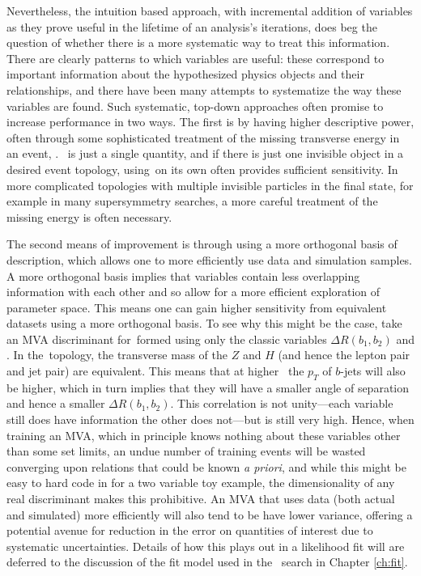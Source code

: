 Nevertheless, the intuition based approach, with incremental addition of variables as they prove useful in the lifetime of an analysis's iterations, does beg the question of whether there is a more systematic way to treat this information.  There are clearly patterns to which variables are useful: these correspond to important information about the hypothesized physics objects and their relationships, and there have been many attempts to systematize the way these variables are found.  Such systematic, top-down approaches often promise to increase performance in two ways.  The first is by having higher descriptive power, often through some sophisticated treatment of the missing transverse energy in an event, \met.  \met\, is just a single quantity, and if there is just one invisible object in a desired event topology, using \met\,on its own often provides sufficient sensitivity.  In more complicated topologies with multiple invisible particles in the final state, for example in many supersymmetry searches, a more careful treatment of the missing energy is often necessary.

  The second means of improvement is through using a more orthogonal basis of description, which allows one to more efficiently use data and simulation samples.  A more orthogonal basis implies that variables contain less overlapping information with each other and so allow for a more efficient exploration of parameter space.  This means one can gain higher sensitivity from equivalent datasets using a more orthogonal basis.  To see why this might be the case, take an MVA discriminant for \ZH\,formed using only the classic variables $\Delta R\left(b_1,b_2\right)$ and \ptv.  In the \ZH\,topology, the transverse mass of the $Z$ and $H$ (and hence the lepton pair and jet pair) are equivalent.  This means that at higher \ptv\, the $p_T$ of $b$-jets will also be higher, which in turn implies that they will have a smaller angle of separation and hence a smaller $\Delta R\left(b_1,b_2\right)$.  This correlation is not unity---each variable still does have information the other does not---but is still very high.  Hence, when training an MVA, which in principle knows nothing about these variables other than some set limits, an undue number of training events will be wasted converging upon relations that could be known \emph{a priori}, and while this might be easy to hard code in for a two variable toy example, the dimensionality of any real discriminant makes this prohibitive.  An MVA that uses data (both actual and simulated) more efficiently will also tend to be have lower variance, offering a potential avenue for reduction in the error on quantities of interest due to systematic uncertainties.  Details of how this plays out in a likelihood fit will are deferred to the discussion of the fit model used in the \vhbb\, search in Chapter \ref{ch:fit}.

